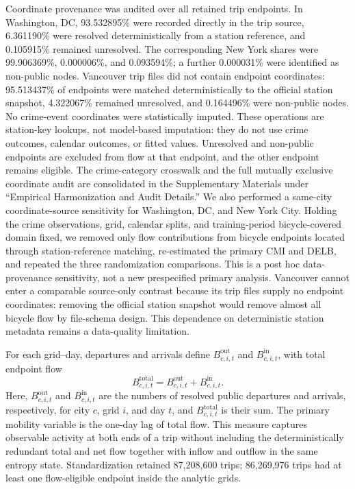 \documentclass[applsci,article,accept,moreauthors]{Definitions/mdpi}
\newcommand{\TotalBicycleTrips}{86,269,976}
\begin{document}
{Coordinate provenance was audited over all retained trip endpoints. In
Washington, DC, 93.532895\% were recorded directly in the trip source,
6.361190\% were resolved deterministically from a station reference, and
0.105915\% remained unresolved. The corresponding New York shares were
99.906369\%, 0.000006\%, and 0.093594\%; a further 0.000031\% were identified
as non-public nodes. Vancouver trip files did not contain endpoint coordinates:
95.513437\% of endpoints were matched deterministically to the official
station snapshot, 4.322067\% remained unresolved, and 0.164496\% were
non-public nodes. No crime-event coordinates were statistically imputed.
These operations are station-key lookups, not model-based imputation: they do
not use crime outcomes, calendar outcomes, or fitted values. Unresolved and
non-public endpoints are excluded from flow at that endpoint, and the other
endpoint remains eligible. {The crime-category crosswalk and the full
mutually exclusive coordinate audit are consolidated in the Supplementary
Materials under ``Empirical Harmonization and Audit Details.''} We
also performed a same-city coordinate-source sensitivity for Washington, DC,
and New York City. Holding the crime observations, grid, calendar splits,
and training-period bicycle-covered domain fixed, we removed only flow
contributions from bicycle endpoints located through station-reference
matching, re-estimated the primary CMI and DELB, and repeated the three
randomization comparisons. This is a post hoc data-provenance sensitivity,
not a new prespecified primary analysis. Vancouver cannot enter a comparable
source-only contrast because its trip files supply no endpoint coordinates:
removing the official station snapshot would remove almost all bicycle flow
by file-schema design. This dependence on deterministic station metadata
remains a data-quality limitation.}

For each grid--day, departures and arrivals define
\(B^{\mathrm{out}}_{c,i,t}\) and \(B^{\mathrm{in}}_{c,i,t}\), with total
endpoint flow
\[
B^{\mathrm{total}}_{c,i,t}
=B^{\mathrm{out}}_{c,i,t}+B^{\mathrm{in}}_{c,i,t}.
\]
{Here, \(B^{\mathrm{out}}_{c,i,t}\) and
\(B^{\mathrm{in}}_{c,i,t}\) are the numbers of resolved public departures
and arrivals, respectively, for city \(c\), grid \(i\), and day \(t\), and
\(B^{\mathrm{total}}_{c,i,t}\) is their sum.}
The primary mobility variable is the one-day lag of total flow. This measure captures
observable activity at both ends of a trip without including the
deterministically redundant total and net flow together with inflow and
outflow in the same entropy state. Standardization retained 87,208,600
trips; \TotalBicycleTrips{} trips had at least one flow-eligible endpoint
inside the analytic grids.
\end{document}
